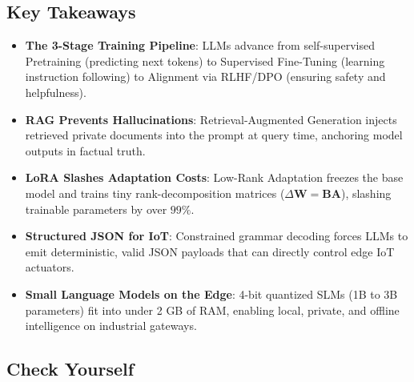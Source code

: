 \subsection{Key Takeaways}\label{subsec:takeaways}

\begin{takeaways}
\begin{itemize}
    \item \textbf{The 3-Stage Training Pipeline}: LLMs advance from self-supervised Pretraining (predicting next tokens) to Supervised Fine-Tuning (learning instruction following) to Alignment via RLHF/DPO (ensuring safety and helpfulness).
    \item \textbf{RAG Prevents Hallucinations}: Retrieval-Augmented Generation injects retrieved private documents into the prompt at query time, anchoring model outputs in factual truth.
    \item \textbf{LoRA Slashes Adaptation Costs}: Low-Rank Adaptation freezes the base model and trains tiny rank-decomposition matrices ($\Delta \mathbf{W} = \mathbf{B}\mathbf{A}$), slashing trainable parameters by over $99\%$.
    \item \textbf{Structured JSON for IoT}: Constrained grammar decoding forces LLMs to emit deterministic, valid JSON payloads that can directly control edge IoT actuators.
    \item \textbf{Small Language Models on the Edge}: 4-bit quantized SLMs (1B to 3B parameters) fit into under 2 GB of RAM, enabling local, private, and offline intelligence on industrial gateways.
\end{itemize}
\end{takeaways}

\subsection{Check Yourself}\label{subsec:check_yourself}

